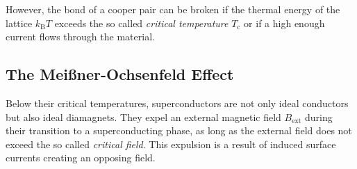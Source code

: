 However, the bond of a cooper pair can be broken if the thermal energy of the lattice $k_\text{B}T$ exceeds the so called \textit{critical temperature} $T_\text{c}$ or if a high enough current flows through the material.

\subsection{The Meißner-Ochsenfeld Effect}
Below their critical temperatures, superconductors are not only ideal conductors but also ideal diamagnets.
They expel an external magnetic field $B_\text{ext}$ during their transition to a superconducting phase, as long as the external field does not exceed the so called \textit{critical field}.
This expulsion is a result of induced surface currents creating an opposing field.
